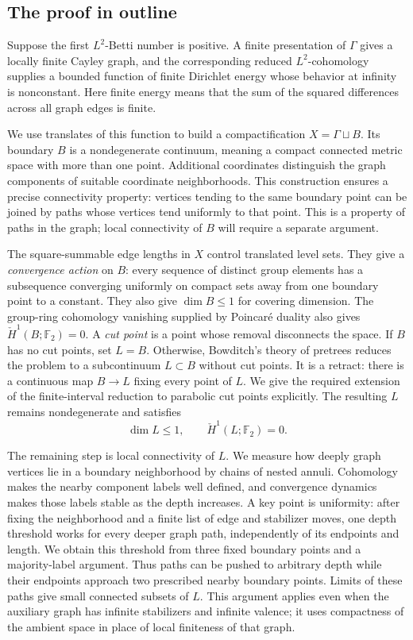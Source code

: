 \subsection{The proof in outline}
Suppose the first $L^2$-Betti number is positive. A finite presentation
of $\Gamma$ gives a locally finite Cayley graph, and the corresponding
reduced $L^2$-cohomology supplies a bounded function of finite Dirichlet
energy whose behavior at infinity is nonconstant. Here finite energy
means that the sum of the squared differences across all graph edges
is finite.

We use translates of this function to build a compactification
$X=\Gamma\sqcup B$. Its boundary $B$ is a nondegenerate continuum,
meaning a compact connected metric space with more than one point.
Additional coordinates distinguish the graph
components of suitable coordinate neighborhoods. This construction
ensures a precise connectivity property: vertices tending to the same
boundary point can be joined by paths whose vertices tend uniformly
to that point. This is a property of paths in the graph; local
connectivity of $B$ will require a separate argument.

The square-summable edge lengths in $X$ control translated level sets.
They give a \emph{convergence action} on $B$: every sequence of distinct
group elements has a subsequence converging uniformly on compact sets
away from one boundary point to a constant. They also give
$\dim B\le1$ for covering dimension. The group-ring cohomology vanishing supplied by
Poincar\'e duality also gives $\check H^1(B;\mathbb F_2)=0$.
A \emph{cut point} is a point whose removal disconnects the space.
If $B$ has no cut points, set $L=B$. Otherwise, Bowditch's theory of
pretrees reduces the problem to a subcontinuum $L\subset B$ without
cut points. It is a retract: there is a continuous map $B\to L$
fixing every point of $L$. We give the required extension of the
finite-interval reduction to parabolic cut points explicitly.
The resulting $L$ remains nondegenerate and satisfies
\[
 \dim L\le1,\qquad \check H^1(L;\mathbb F_2)=0.
\]

The remaining step is local connectivity of $L$. We measure how deeply
graph vertices lie in a boundary neighborhood by chains of nested
annuli. Cohomology makes the nearby component labels well defined,
and convergence dynamics makes those labels stable as the depth
increases. A key point is uniformity: after fixing the neighborhood and
a finite list of edge and stabilizer moves, one depth threshold works
for every deeper graph path, independently of its endpoints and length.
We obtain this threshold from three fixed boundary points and a
majority-label argument. Thus paths can be pushed to arbitrary depth while their
endpoints approach two prescribed nearby boundary points. Limits of
these paths give small connected subsets of $L$. This argument applies
even when the auxiliary graph has infinite stabilizers and infinite
valence; it uses compactness of the ambient space in place of local
finiteness of that graph.

